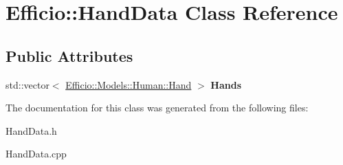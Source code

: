 \hypertarget{class_efficio_1_1_hand_data}{}\section{Efficio\+:\+:Hand\+Data Class Reference}
\label{class_efficio_1_1_hand_data}
\subsection*{Public Attributes}
\begin{DoxyCompactItemize}
\item 
std\+::vector$<$ \hyperlink{class_efficio_1_1_models_1_1_human_1_1_hand}{Efficio\+::\+Models\+::\+Human\+::\+Hand} $>$ {\bfseries Hands}\hypertarget{class_efficio_1_1_hand_data_a2c4c5e8dcb14692c918f1994859978f7}{}\label{class_efficio_1_1_hand_data_a2c4c5e8dcb14692c918f1994859978f7}

\end{DoxyCompactItemize}


The documentation for this class was generated from the following files\+:\begin{DoxyCompactItemize}
\item 
Hand\+Data.\+h\item 
Hand\+Data.\+cpp\end{DoxyCompactItemize}
